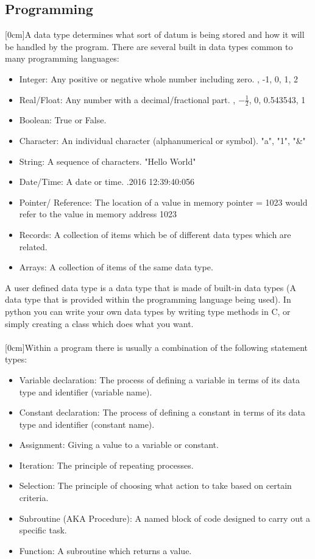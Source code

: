 \subsection{Programming}
  \noindent
  [0cm]A data type determines what sort of datum is being stored and how it will be handled by the program. There are several built in data types common to many programming languages:
  \begin{itemize}
    \setlength\itemsep{0em}
    \item Integer: Any positive or negative whole number including zero.
      , -1, 0, 1, 2
    \item Real/Float: Any number with a decimal/fractional part.
      , $ -\frac{1}{2} $, 0, 0.543543, 1
    \item Boolean: True or False.
    \item Character: An individual character (alphanumerical or symbol).
      \subitem "a", "1", "\&"
    \item String: A sequence of characters.
      \subitem "Hello World"
    \item Date/Time: A date or time.
      .2016 12:39:40:056
    \item Pointer/ Reference: The location of a value in memory
	  \subitem pointer = 1023 would refer to the value in memory address 1023
    \item Records: A collection of items which be of different data types which are related.
    \item Arrays: A collection of items of the same data type.
  \end{itemize}
  A user defined data type is a data type that is made of built-in data types (A data type that is provided within the programming language being used). In python you can write your own data types by writing type methods in C, or simply creating a class which does what you want. \\ \\
  [0cm]Within a program there is usually a combination of the following statement types:
  \begin{itemize}
    \setlength\itemsep{0em}
    \item Variable declaration: The process of defining a variable in terms of its data type and identifier (variable name).
    \item Constant declaration: The process of defining a constant in terms of its data type and identifier (constant name).
    \item Assignment: Giving a value to a variable or constant.
    \item Iteration: The principle of repeating processes.
    \item Selection: The principle of choosing what action to take based on certain criteria.
    \item Subroutine (AKA Procedure): A named block of code designed to carry out a specific task.
    \item Function: A subroutine which returns a value.
  \end{itemize}
